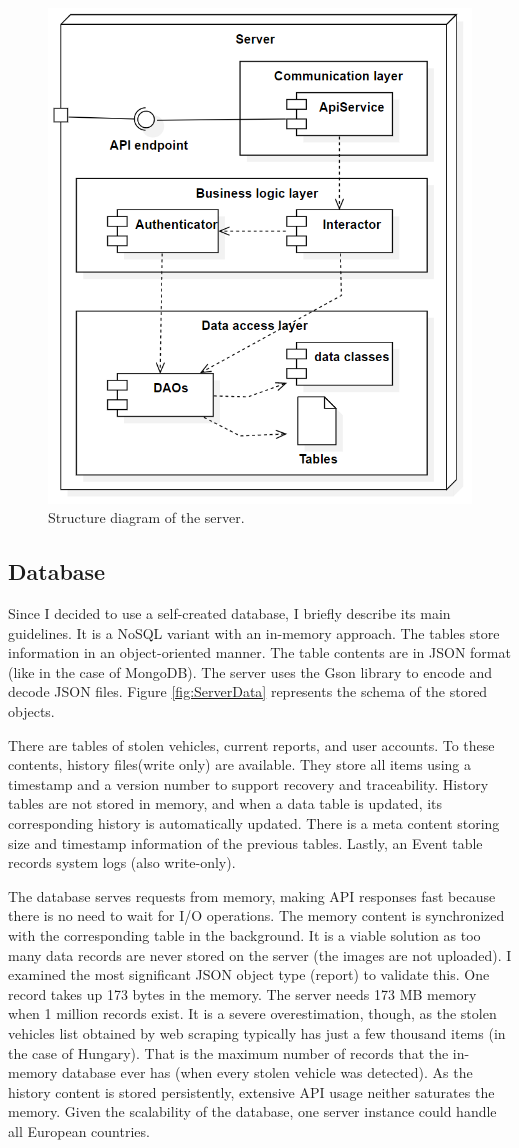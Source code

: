 \begin{figure}[htb]
 \centerline{\includegraphics[width=0.5\columnwidth]{.//Figure/System/ServerStructure.png}}
 \caption{Structure diagram of the server.}
 \label{fig:ServerStructure}
\end{figure}

\subsection{Database}

Since I decided to use a self-created database, I briefly describe its main guidelines. It is a NoSQL variant with an in-memory approach. The tables store information in an object-oriented manner. The table contents are in JSON format (like in the case of MongoDB). The server uses the Gson library to encode and decode JSON files. Figure \ref{fig:ServerData} represents the schema of the stored objects.

There are tables of stolen vehicles, current reports, and user accounts. To these contents, history files(write only) are available. They store all items using a timestamp and a version number to support recovery and traceability. History tables are not stored in memory, and when a data table is updated, its corresponding history is automatically updated. There is a meta content storing size and timestamp information of the previous tables. Lastly, an Event table records system logs (also write-only).

The database serves requests from memory, making API responses fast because there is no need to wait for I/O operations. The memory content is synchronized with the corresponding table in the background. It is a viable solution as too many data records are never stored on the server (the images are not uploaded). I examined the most significant JSON object type (report) to validate this. One record takes up 173 bytes in the memory. The server needs 173 MB memory when 1 million records exist. It is a severe overestimation, though, as the stolen vehicles list obtained by web scraping typically has just a few thousand items (in the case of Hungary). That is the maximum number of records that the in-memory database ever has (when every stolen vehicle was detected). As the history content is stored persistently, extensive API usage neither saturates the memory. Given the scalability of the database, one server instance could handle all European countries.

